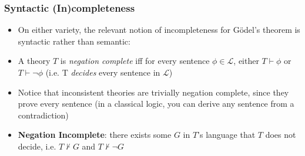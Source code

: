 \begin{frame}
\frametitle{Syntactic (In)completeness}

\begin{itemize}[<+->]

\item On either variety, the relevant notion of incompleteness for G\"odel's theorem is syntactic rather than semantic:

\item A theory $T$ is \emph{negation complete} iff for every sentence $\phi \in \mathcal{L}$, either $T \vdash \phi$ or $T \vdash \neg \phi$ (i.e. T \textit{decides} every sentence in $\mathcal{L}$)

\item Notice that inconsistent theories are trivially negation complete, since they prove every sentence (in a classical logic, you can derive any sentence from a contradiction)

\item \textbf{Negation Incomplete}: there exists some $G$ in $T$'s language that $T$ does not decide, i.e. $T \nvdash G$ and $T \nvdash \neg G$


\end{itemize}
\end{frame}

